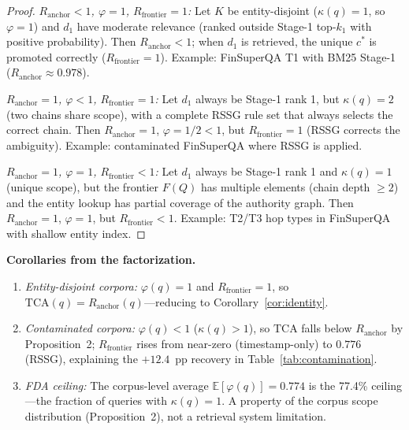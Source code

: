 \documentclass[11pt]{article}
\begin{document}
\begin{proof}
\emph{$R_{\mathrm{anchor}} < 1$, $\varphi = 1$, $R_{\mathrm{frontier}} = 1$:} Let $K$ be entity-disjoint ($\kappa(q)=1$, so $\varphi=1$) and $d_1$ have moderate relevance (ranked outside Stage-1 top-$k_1$ with positive probability). Then $R_{\mathrm{anchor}} < 1$; when $d_1$ is retrieved, the unique $c^*$ is promoted correctly ($R_{\mathrm{frontier}}=1$). Example: FinSuperQA T1 with BM25 Stage-1 ($R_{\mathrm{anchor}} \approx 0.978$).

\emph{$R_{\mathrm{anchor}} = 1$, $\varphi < 1$, $R_{\mathrm{frontier}} = 1$:} Let $d_1$ always be Stage-1 rank 1, but $\kappa(q) = 2$ (two chains share scope), with a complete RSSG rule set that always selects the correct chain. Then $R_{\mathrm{anchor}}=1$, $\varphi = 1/2 < 1$, but $R_{\mathrm{frontier}}=1$ (RSSG corrects the ambiguity). Example: contaminated FinSuperQA where RSSG is applied.

\emph{$R_{\mathrm{anchor}} = 1$, $\varphi = 1$, $R_{\mathrm{frontier}} < 1$:} Let $d_1$ always be Stage-1 rank 1 and $\kappa(q) = 1$ (unique scope), but the frontier $F(Q)$ has multiple elements (chain depth $\geq 2$) and the entity lookup has partial coverage of the authority graph. Then $R_{\mathrm{anchor}}=1$, $\varphi=1$, but $R_{\mathrm{frontier}} < 1$. Example: T2/T3 hop types in FinSuperQA with shallow entity index.
\end{proof}

\noindent\textbf{Corollaries from the factorization.}
\begin{enumerate}[noitemsep,label=(\alph*)]
  \item \emph{Entity-disjoint corpora:} $\varphi(q) = 1$ and $R_{\mathrm{frontier}} = 1$, so $\mathrm{TCA}(q) = R_{\mathrm{anchor}}(q)$---reducing to Corollary~\ref{cor:identity}.
  \item \emph{Contaminated corpora:} $\varphi(q) < 1$ ($\kappa(q) > 1$), so $\mathrm{TCA}$ falls below $R_{\mathrm{anchor}}$ by Proposition~2; $R_{\mathrm{frontier}}$ rises from near-zero (timestamp-only) to $0.776$ (RSSG), explaining the $+12.4$~pp recovery in Table~\ref{tab:contamination}.
  \item \emph{FDA ceiling:} The corpus-level average $\mathbb{E}[\varphi(q)] = 0.774$ is the 77.4\% ceiling---the fraction of queries with $\kappa(q) = 1$. A property of the corpus scope distribution (Proposition~2), not a retrieval system limitation.
\end{enumerate}

\end{document}
